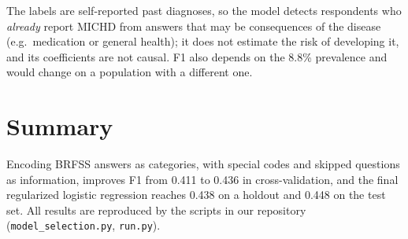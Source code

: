 \documentclass[10pt,conference,compsocconf]{IEEEtran}
\begin{document}
The labels are self-reported past diagnoses, so the model detects respondents
who \emph{already} report MICHD from answers that may be consequences of the
disease (e.g.\ medication or general health); it does not estimate the risk
of developing it, and its coefficients are not causal. F1 also depends on the
8.8\% prevalence and would change on a population with a different one.

\section{Summary}
Encoding BRFSS answers as categories, with special codes and skipped questions
as information, improves F1 from 0.411 to 0.436 in cross-validation, and the
final regularized logistic regression reaches 0.438 on a holdout and 0.448 on
the test set. All results are reproduced by the scripts in our repository
(\texttt{model\_selection.py}, \texttt{run.py}).



\end{document}
